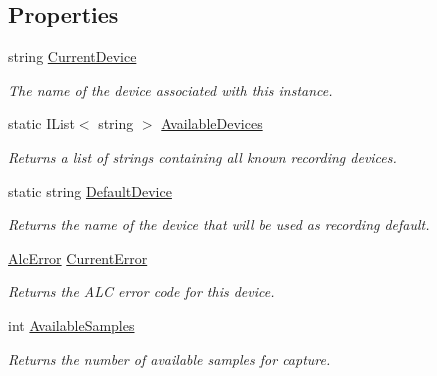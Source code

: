 \subsection*{Properties}
\begin{DoxyCompactItemize}
\item 
string \hyperlink{class_open_t_k_1_1_audio_1_1_audio_capture_ae5998b54c75f78acd25d86c2cdb5e068}{Current\-Device}
\begin{DoxyCompactList}\small\item\em The name of the device associated with this instance. \end{DoxyCompactList}\item 
static I\-List$<$ string $>$ \hyperlink{class_open_t_k_1_1_audio_1_1_audio_capture_ad7c36a085e0c750f4d81f5a3c5eb23d4}{Available\-Devices}
\begin{DoxyCompactList}\small\item\em Returns a list of strings containing all known recording devices. \end{DoxyCompactList}\item 
static string \hyperlink{class_open_t_k_1_1_audio_1_1_audio_capture_a1d06f49a2c734c2ade40630f54b16d6a}{Default\-Device}
\begin{DoxyCompactList}\small\item\em Returns the name of the device that will be used as recording default. \end{DoxyCompactList}\item 
\hyperlink{namespace_open_t_k_1_1_audio_1_1_open_a_l_a2684b7587fe0457a0203cacbdace7bc5}{Alc\-Error} \hyperlink{class_open_t_k_1_1_audio_1_1_audio_capture_aa96bb3494c76ff42f3025955a54a9fa3}{Current\-Error}
\begin{DoxyCompactList}\small\item\em Returns the A\-L\-C error code for this device.\end{DoxyCompactList}\item 
int \hyperlink{class_open_t_k_1_1_audio_1_1_audio_capture_a762b64b2992d6d3f4ba2273bf66fbe41}{Available\-Samples}
\begin{DoxyCompactList}\small\item\em Returns the number of available samples for capture.\end{DoxyCompactList}\item 

\end{DoxyCompactItemize}
